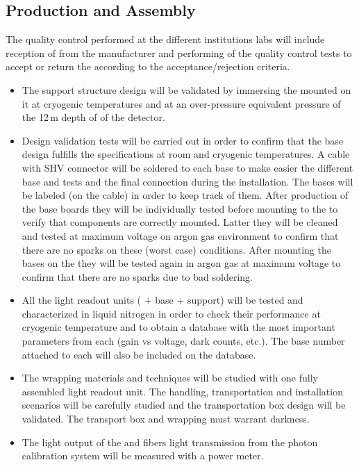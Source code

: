  \subsection{Production and Assembly}
 \label{sec:fddp-pd-10.1}
 
The quality control performed at the different institutions labs will include reception of  from the manufacturer and performing of the quality control tests to accept or return the  according to the acceptance/rejection criteria.

\begin{itemize}
\item The  support structure design will be validated by immersing the  mounted on it at cryogenic temperatures and at an over-pressure equivalent pressure of the 12\,m depth of \lar of the detector.
\item Design validation tests will be carried out in order to confirm that the  base design fulfills the specifications at room and cryogenic temperatures. A cable with SHV connector will be soldered to each  base to make easier the different base and  tests and the final  connection during the installation. The  bases will be labeled (on the cable) in order to keep track of them. After production of the  base boards they will be individually tested before mounting to the  to verify that components are correctly mounted. Latter they will be cleaned and tested at maximum voltage on argon gas environment to confirm that there are no sparks on these (worst case) conditions.
After mounting the bases on the  they will be tested again in argon gas at maximum voltage to confirm that there are no sparks due to bad soldering.
\item All the light readout units ( + base + support) will be tested and characterized in liquid nitrogen in order to check their performance at cryogenic temperature and to obtain a database with the most important parameters from each  (gain vs voltage, dark counts, etc.). The  base number attached to each  will also be included on the database. 
\item The wrapping materials and techniques will be studied with one fully assembled light readout unit. The handling, transportation and installation scenarios will be carefully studied and the transportation box design will be validated. The transport box and  wrapping must warrant darkness.
\item The light output of the   and fibers light transmission from the photon calibration system will be measured with a power meter.
\end{itemize}

